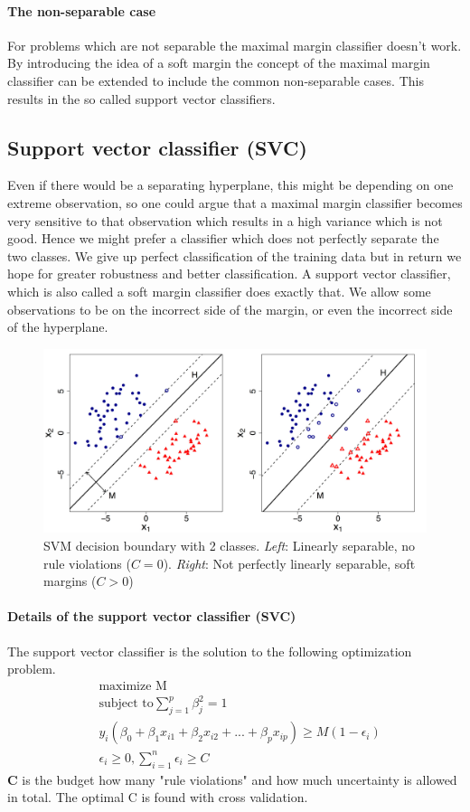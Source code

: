 \documentclass[../document.tex]{subfiles}
\begin{document}
	\paragraph{The non-separable case}
	For problems which are not separable the maximal margin classifier doesn't work. By introducing the idea of a soft margin the concept of the maximal margin classifier can be extended to include the common non-separable cases. This results in the so called support vector classifiers.

	\subsection{Support vector classifier (SVC)}
	Even if there would be a separating hyperplane, this might be depending on one extreme observation, so one could argue that a maximal margin classifier becomes very sensitive to that observation which results in a high variance which is not good. Hence we might prefer a classifier which does not perfectly separate the two classes. We give up perfect classification of the training data but in return we hope for greater robustness and better classification. A support vector classifier, which is also called a soft margin classifier does exactly that. We allow some observations to be on the incorrect side of the margin, or even the incorrect side of the hyperplane.

	\begin{figure}[H]
		\centering
		\includegraphics[width=0.7\linewidth]{pictures/svm}
		\caption{SVM decision boundary with 2 classes.
		\emph{Left}: Linearly separable, no rule violations ($C=0$).
		\emph{Right}: Not perfectly linearly separable, soft margins ($C>0$)}
		\label{fig:svm_decision_boundary}
	\end{figure}

	\paragraph{Details of the support vector classifier (SVC)}
	The support vector classifier is the solution to the following optimization problem.
	\begin{equation}
	\begin{split}
		&\text{maximize M}\\
		&\text{subject to}\sum_{j=1}^{p}\beta_{j}^2=1\\
		&y_{i}(\beta_{0}+\beta_{1}x_{i1}+\beta_{2}x_{i2}+...+\beta_{p}x_{ip})\ge M(1-\epsilon_{i})\\
		&\epsilon_{i}\ge 0, \sum_{i=1}^{n}\epsilon_{i}\ge C
	\end{split}
	\end{equation}
	\textbf{C} is the budget how many "rule violations" and how much uncertainty is allowed in total. The optimal C is found with cross validation.
\end{document}
